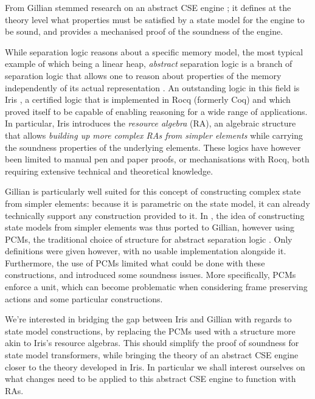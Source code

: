 From Gillian stemmed research on an abstract CSE engine \cite{cse1,cse2}; it defines at the theory level what properties must be satisfied by a state model for the engine to be sound, and provides a mechanised proof of the soundness of the engine.

While separation logic reasons about a specific memory model, the most typical example of which being a linear heap, \emph{abstract} separation logic is a branch of separation logic that allows one to reason about properties of the memory independently of its actual representation \cite{higherorderseplogic,abstractseplogic}. An outstanding logic in this field is Iris \cite{iris}, a certified logic that is implemented in Rocq (formerly Coq) \cite{coq} and which proved itself to be capable of enabling reasoning for a wide range of applications. In particular, Iris introduces the \emph{resource algebra} (RA), an algebraic structure that allows \emph{building up more complex RAs from simpler elements} while carrying the soundness properties of the underlying elements. These logics have however been limited to manual pen and paper proofs, or mechanisations with Rocq, both requiring extensive technical and theoretical knowledge.

Gillian is particularly well suited for this concept of constructing complex state from simpler elements: because it is parametric on the state model, it can already technically support any construction provided to it. In \cite{sacha-phd}, the idea of constructing state models from simpler elements was thus ported to Gillian, however using PCMs, the traditional choice of structure for abstract separation logic \cite{abstractseplogic,sepalgebra,iris1,higherorderseplogic}. Only definitions were given however, with no usable implementation alongside it. Furthermore, the use of PCMs limited what could be done with these constructions, and introduced some soundness issues. More specifically, PCMs enforce a unit, which can become problematic when considering frame preserving actions and some particular constructions.

We're interested in bridging the gap between Iris and Gillian with regards to state model constructions, by replacing the PCMs used with a structure more akin to Iris's resource algebras. This should simplify the proof of soundness for state model transformers, while bringing the theory of an abstract CSE engine closer to the theory developed in Iris. In particular we shall interest ourselves on what changes need to be applied to this abstract CSE engine to function with RAs.

